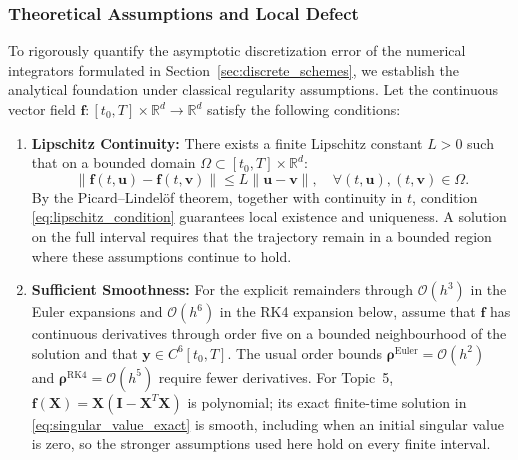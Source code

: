\documentclass[11pt,a4paper]{article}
\theoremstyle{definition}
\theoremstyle{remark}
\begin{document}
\subsubsection{Theoretical Assumptions and Local Defect}
To rigorously quantify the asymptotic discretization error of the numerical integrators formulated in Section~\ref{sec:discrete_schemes}, we establish the analytical foundation under classical regularity assumptions. Let the continuous vector field $\mathbf{f}: [t_0, T] \times \mathbb{R}^d \to \mathbb{R}^d$ satisfy the following conditions:
\begin{enumerate}
    \item \textbf{Lipschitz Continuity:} There exists a finite Lipschitz constant $L > 0$ such that on a bounded domain $\Omega \subset [t_0, T] \times \mathbb{R}^d$:
    \begin{equation}
    \label{eq:lipschitz_condition}
    \|\mathbf{f}(t, \mathbf{u}) - \mathbf{f}(t, \mathbf{v})\| \le L \|\mathbf{u} - \mathbf{v}\|, \quad \forall (t, \mathbf{u}), (t, \mathbf{v}) \in \Omega.
    \end{equation}
    By the Picard--Lindel\"of theorem, together with continuity in $t$, condition \eqref{eq:lipschitz_condition} guarantees local existence and uniqueness. A solution on the full interval requires that the trajectory remain in a bounded region where these assumptions continue to hold.
    \item \textbf{Sufficient Smoothness:} For the explicit remainders through $\mathcal{O}(h^3)$ in the Euler expansions and $\mathcal{O}(h^6)$ in the RK4 expansion below, assume that $\mathbf f$ has continuous derivatives through order five on a bounded neighbourhood of the solution and that $\mathbf y\in C^6[t_0,T]$. The usual order bounds $\boldsymbol\rho^{\mathrm{Euler}}=\mathcal{O}(h^2)$ and $\boldsymbol\rho^{\mathrm{RK4}}=\mathcal{O}(h^5)$ require fewer derivatives. For Topic~5, $\mathbf f(\mathbf X)=\mathbf X(\mathbf I-\mathbf X^T\mathbf X)$ is polynomial; its exact finite-time solution in \eqref{eq:singular_value_exact} is smooth, including when an initial singular value is zero, so the stronger assumptions used here hold on every finite interval.
\end{enumerate}
\end{document}
